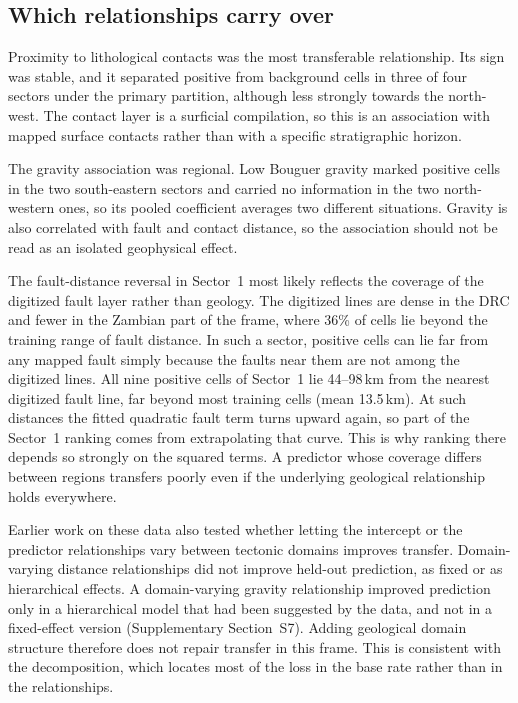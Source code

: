 \documentclass[pdflatex,sn-basic]{sn-jnl}%
\begin{document}
\subsection{Which relationships carry over}
\label{sec:disc-predictors}

Proximity to lithological contacts was the most transferable relationship. Its sign was stable, and it separated positive from background cells in three of four sectors under the primary partition, although less strongly towards the north-west. The contact layer is a surficial compilation, so this is an association with mapped surface contacts rather than with a specific stratigraphic horizon.

The gravity association was regional. Low Bouguer gravity marked positive cells in the two south-eastern sectors and carried no information in the two north-western ones, so its pooled coefficient averages two different situations. Gravity is also correlated with fault and contact distance, so the association should not be read as an isolated geophysical effect.

The fault-distance reversal in Sector~1 most likely reflects the coverage of the digitized fault layer rather than geology. The digitized lines are dense in the DRC and fewer in the Zambian part of the frame, where 36\% of cells lie beyond the training range of fault distance. In such a sector, positive cells can lie far from any mapped fault simply because the faults near them are not among the digitized lines. All nine positive cells of Sector~1 lie 44--98\,km from the nearest digitized fault line, far beyond most training cells (mean 13.5\,km). At such distances the fitted quadratic fault term turns upward again, so part of the Sector~1 ranking comes from extrapolating that curve. This is why ranking there depends so strongly on the squared terms. A predictor whose coverage differs between regions transfers poorly even if the underlying geological relationship holds everywhere.

Earlier work on these data also tested whether letting the intercept or the predictor relationships vary between tectonic domains \citep{Daly2025} improves transfer. Domain-varying distance relationships did not improve held-out prediction, as fixed or as hierarchical effects. A domain-varying gravity relationship improved prediction only in a hierarchical model that had been suggested by the data, and not in a fixed-effect version (Supplementary Section~S7). Adding geological domain structure therefore does not repair transfer in this frame. This is consistent with the decomposition, which locates most of the loss in the base rate rather than in the relationships.
\end{document}
